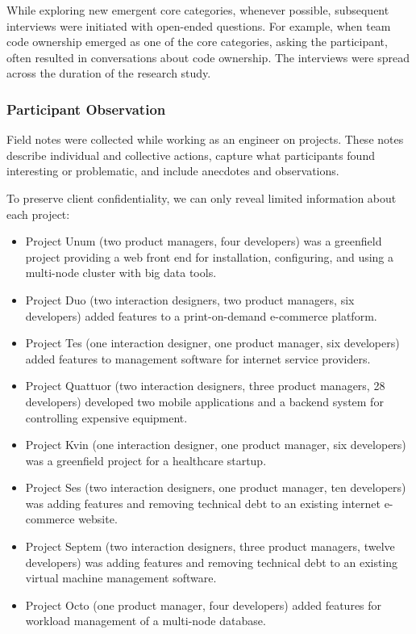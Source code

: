 While exploring new emergent core categories, whenever possible, subsequent interviews were initiated with open-ended questions.  For example, when team code ownership emerged as one of the core categories, asking the participant,  often resulted in conversations about code ownership. The interviews were spread across the duration of the research study. 




\subsubsection{Participant Observation}
Field notes were collected while working as an engineer on \numberOfObservedProjects{} projects. These notes describe individual and collective actions, capture what participants found interesting or problematic, and include anecdotes and observations.


To preserve client confidentiality, we can only reveal limited information about each project:
\begin{itemize}
\item Project Unum (two product managers, four developers) was a greenfield project providing a web front end for installation, configuring, and using a multi-node cluster with big data tools. 
\item Project Duo (two interaction designers, two product managers, six developers) added features to a print-on-demand e-commerce platform. 
\item Project Tes (one interaction designer, one product manager, six developers) added features to management software for internet service providers.
\item Project Quattuor (two interaction designers, three product managers, 28 developers) developed two mobile applications and a backend system for controlling expensive equipment.
\item Project Kvin (one interaction designer, one product manager, six developers) was a greenfield project for a healthcare startup. 
\item Project Ses (two interaction designers, one product manager, ten developers) was adding features and removing technical debt to an existing internet e-commerce website.
\item Project Septem (two interaction designers, three product managers, twelve developers) was adding features and removing technical debt to an existing virtual machine management software.
\item Project Octo (one product manager, four developers) added features for  workload management of a multi-node database.
\end{itemize}




